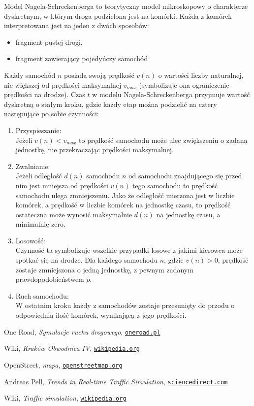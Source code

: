\documentclass[a4paper,12pt]{article}
\begin{document}
	Model Nagela-Schreckenberga to teorytyczny model mikroskopowy o charakterze dyskretnym, w którym droga podzielona jest na komórki. Każda z komórek interpretowana jest na jeden z dwóch sposobów:
	\begin{itemize}
		\item fragment pustej drogi,
		\item fragment zawierający pojedyńczy samochód
	\end{itemize}
	Każdy samochód $n$ posiada swoją prędkość $v(n)$ o wartości liczby naturalnej, nie większej od prędkości maksymalnej $v_{max}$ (symbolizuje ona ograniczenie prędkości na drodze).
	Czas $t$ w modelu Nagela-Schreckenberga przyjmuje wartość dyskretną o stałym kroku, gdzie każdy etap można podzielić na cztery następujące po sobie czynności:
	\begin{enumerate}
		\item Przyspieszanie: \\
		Jeżeli $v(n) < v_{max}$ to prędkość samochodu może ulec zwiększeniu o zadaną jednostkę, nie przekraczając prędkości maksymalnej.
		\item Zwalnianie: \\
		Jeżeli odległość $d(n)$ samochodu $n$ od samochodu znajdującego się przed nim jest mniejsza od prędkości $v(n)$ tego samochodu to prędkość samochodu ulega zmniejszeniu. Jako że odległość mierzona jest w liczbie komórek, a prędkość w liczbie komórek na jednostkę czasu, to prędkość ostateczna może wynosić maksymalnie $d(n)$ na jednostkę czasu, a minimalnie zero.
		\item Losowość: \\
		Czynność ta symbolizuje wszelkie przypadki losowe z jakimi kierowca może spotkać się na drodze. Dla każdego samochodu $n$, gdzie $v(n) > 0$, prędkość zostaje zmniejszona o jedną jednostkę, z pewnym zadanym prawdopodobieństwem $p$.
		\item Ruch samochodu: \\
		W ostatnim kroku każdy z samochodów zostaje przesunięty do przodu o odpowiednią ilość komórek, wynikającą z jego prędkości.
	\end{enumerate}
	
	\pagebreak
	\begin{thebibliography}{15}
		One Road, \textit{Symulacje ruchu drogowego},
		\texttt{\href{http://www.oneroad.pl/symulacje-ruchu-drogowego/}{oneroad.pl}}
		
		Wiki, \textit{Kraków Obwodnica IV},
		\texttt{\href{https://pl.wikipedia.org/wiki/Obwodnice_Krakowa\#IV_obwodnica}{wikipedia.org}}
		
		OpenStreet, \textit{mapa},
		\texttt{\href{https://www.openstreetmap.org/}{openstreetmap.org}}
		
		Andreas Pell, \textit{Trends in Real-time Traffic Simulation},
		\texttt{\href{https://www.sciencedirect.com/science/article/pii/S2352146517304684}{sciencedirect.com}}
		
		Wiki, \textit{Traffic simulation},
		\texttt{\href{https://en.wikipedia.org/wiki/Traffic_simulation}{wikipedia.org}}
	\end{thebibliography}
	
\end{document}
